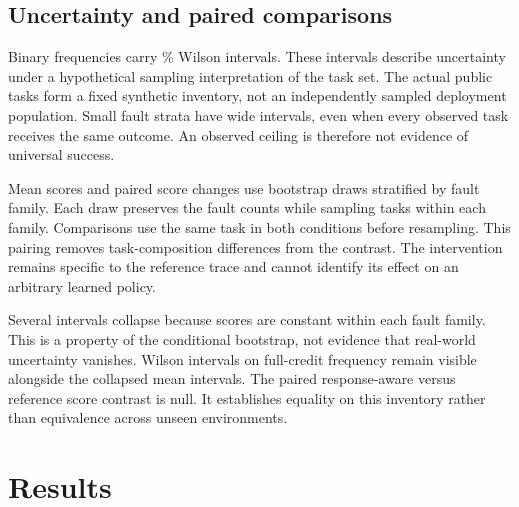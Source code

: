 \documentclass{article}
\begin{document}
\subsection{Uncertainty and paired comparisons}
Binary frequencies carry \CiLevel\% Wilson intervals. These intervals describe uncertainty under a hypothetical sampling interpretation of the task set. The actual public tasks form a fixed synthetic inventory, not an independently sampled deployment population. Small fault strata have wide intervals, even when every observed task receives the same outcome. An observed ceiling is therefore not evidence of universal success.\par
Mean scores and paired score changes use \NBoot{} bootstrap draws stratified by fault family. Each draw preserves the fault counts while sampling tasks within each family. Comparisons use the same task in both conditions before resampling. This pairing removes task-composition differences from the contrast. The intervention remains specific to the reference trace and cannot identify its effect on an arbitrary learned policy.\par
Several intervals collapse because scores are constant within each fault family. This is a property of the conditional bootstrap, not evidence that real-world uncertainty vanishes. Wilson intervals on full-credit frequency remain visible alongside the collapsed mean intervals. The paired response-aware versus reference score contrast is null. It establishes equality on this inventory rather than equivalence across unseen environments.\par
\section{Results}
\end{document}
